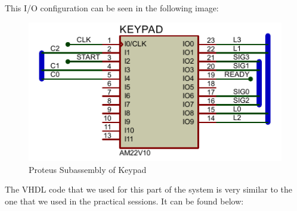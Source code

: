 This I/O configuration can be seen in the following image:\medskip

\begin{figure}[H]
    \centering
    \includegraphics[scale = 1]{Graphics/KEYPAD/KEYPAD_PROTEUS.PDF}
    \caption{Proteus Subassembly of Keypad}
    \label{fig:KEYPAD_PROTEUS}
\end{figure}

\clearpage

The VHDL code that we used for this part of the system is very similar to the one that we used in the practical sessions. It can be found below: 

\vspace{0.5cm}

